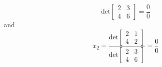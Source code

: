 \begin{enumerate}
\begin{mdframed}[style=MyFrame]
\begin{equation}
{                        }
                        {
                            \text{det}
                            \begin{bmatrix}
                                2   &   3   \\
                                4   &   6   
                            \end{bmatrix}
                        }
                        =
                        \frac{0}{0}
            \end{equation}
            and
            \begin{equation}
                x_{2} = \frac{
                            \text{det}
                            \begin{bmatrix}
                                2   &   1   \\
                                4   &   2   
                            \end{bmatrix}
                        }
                        {
                            \text{det}
                            \begin{bmatrix}
                                2   &   3   \\
                                4   &   6   
                            \end{bmatrix}
                        }
                        =
                        \frac{0}{0}
            \end{equation}
        \end{mdframed}



\end{enumerate}
